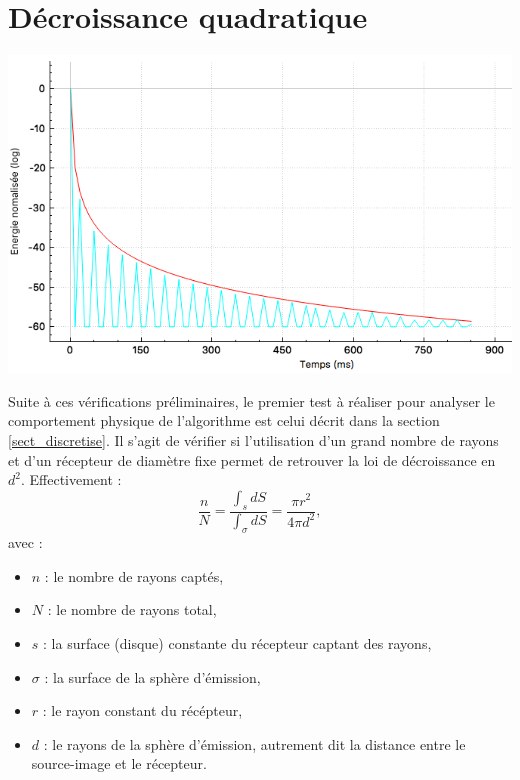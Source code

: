 \begin{figureth}
\begin{subfigureth}{0.45\textwidth}
		\caption{Propagation des rayons depuis les sources-images vers le récepteur à l'ordre 1.}
		\label{testBeam2}
	\end{subfigureth}
	\caption{Visualisation des rayons captés par le récepteur à l'ordre 0 et 1 récepteur (100000 rayons au total)}
\end{figureth}




\section{Décroissance quadratique}


\begin{figureth}
	\includegraphics[width=0.8\linewidth]{images/test1}
	\caption{Réponse impulsionnelle en espace libre pour 3 millions de rayons (bleu) échantillonnée à 100Hz et fonction $f(x)=\frac{2}{x^2}$ (rouge)}
	\label{test1}
\end{figureth}


Suite à ces vérifications préliminaires, le premier test à réaliser pour analyser le comportement physique de l'algorithme est celui décrit dans la section \ref{sect_discretise}. Il s'agit de vérifier si l'utilisation d'un grand nombre de rayons et d'un récepteur de diamètre fixe permet de retrouver la loi de décroissance en $d^2$. Effectivement :
\begin{equation}
\frac{n}{N} = \frac{\int_s dS}{\int_{\sigma} dS} = \frac{\pi r^2}{4\pi d^2},
\end{equation}
avec :
\begin{itemize}
\item$n$ : le nombre de rayons captés,
\item$N$ : le nombre de rayons total,
\item$s$ : la surface (disque) constante du récepteur captant des rayons,
\item$\sigma$ : la surface de la sphère d'émission,
\item$r$ : le rayon constant du récépteur,
\item$d$ : le rayons de la sphère d'émission, autrement dit la distance entre le source-image et le récepteur.
\end{itemize}


